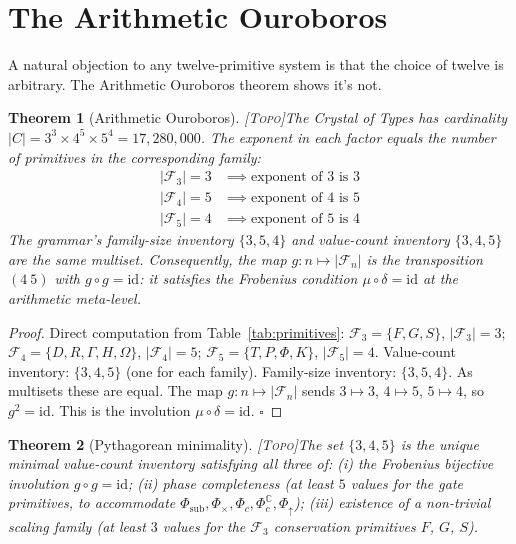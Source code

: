 \documentclass[12pt,a4paper]{article}
\newtheorem{theorem}{Theorem}
\newcommand{\Phic}{\Phi_c}
\newcommand{\TOPO}{\textsc{[Topo]}}
\begin{document}
\section{The Arithmetic Ouroboros}
\label{sec:ouroboros}

A natural objection to any twelve-primitive system is that the choice of
twelve is arbitrary. The Arithmetic Ouroboros theorem shows it's not.

\begin{theorem}[Arithmetic Ouroboros]
\label{thm:ouroboros}
\TOPO\quad The Crystal of Types has cardinality
$|C| = 3^3 \times 4^5 \times 5^4 = 17{,}280{,}000$.
The exponent in each factor equals the number of primitives in
the corresponding family:
\begin{align*}
  |\mathcal{F}_3| = 3 &\implies \text{exponent of } 3 \text{ is } 3 \\
  |\mathcal{F}_4| = 5 &\implies \text{exponent of } 4 \text{ is } 5 \\
  |\mathcal{F}_5| = 4 &\implies \text{exponent of } 5 \text{ is } 4
\end{align*}
The grammar's family-size inventory $\{3, 5, 4\}$ and value-count
inventory $\{3, 4, 5\}$ are the same multiset. Consequently, the map
$g: n \mapsto |\mathcal{F}_n|$ is the transposition $(4\ 5)$ with
$g \circ g = \mathrm{id}$: it satisfies the Frobenius condition
$\mu \circ \delta = \mathrm{id}$ at the arithmetic meta-level.
\end{theorem}

\begin{proof}
Direct computation from Table~\ref{tab:primitives}:
$\mathcal{F}_3 = \{F, G, S\}$, $|\mathcal{F}_3| = 3$;
$\mathcal{F}_4 = \{D, R, \Gamma, H, \Omega\}$, $|\mathcal{F}_4| = 5$;
$\mathcal{F}_5 = \{T, P, \Phi, K\}$, $|\mathcal{F}_5| = 4$.
Value-count inventory: $\{3, 4, 5\}$ (one for each family).
Family-size inventory: $\{3, 5, 4\}$.
As multisets these are equal. The map $g: n \mapsto |\mathcal{F}_n|$ sends
$3 \mapsto 3$, $4 \mapsto 5$, $5 \mapsto 4$, so $g^2 = \mathrm{id}$.
This is the involution $\mu \circ \delta = \mathrm{id}$. \qquad$\square$
\end{proof}

\begin{theorem}[Pythagorean minimality]
\label{thm:pythagorean}
\TOPO\quad The set $\{3,4,5\}$ is the unique minimal value-count
inventory satisfying all three of: (i) the Frobenius bijective
involution $g \circ g = \mathrm{id}$;
(ii) phase completeness (at least $5$ values for the gate primitives,
to accommodate $\Phi_\text{sub}, \Phi_\times, \Phic, \Phic^\mathbb{C},
\Phi_\uparrow$);
(iii) existence of a non-trivial scaling family (at least $3$ values
for the $\mathcal{F}_3$ conservation primitives $F$, $G$, $S$).
\end{theorem}
\end{document}
